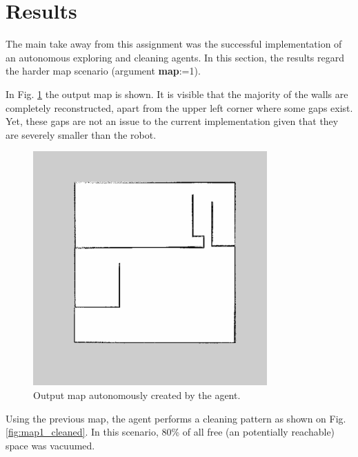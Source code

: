 \documentclass[]{article}
\begin{document}
\section{Results}

The main take away from this assignment was the successful implementation of an autonomous exploring and cleaning agents. In this section, the results regard the harder map scenario (argument \textbf{map}:=1).

In Fig. \ref{fig:map1} the output map is shown. It is visible that the majority of the walls are completely reconstructed, apart from the upper left corner where some gaps exist. Yet, these gaps are not an issue to the current implementation given that they are severely smaller than the robot.

\begin{figure}[ht]
    \centering
    \includegraphics[width=0.8\textwidth]{imgs/map1.pdf}
    \caption{Output map autonomously created by the agent.}
    \label{fig:map1}
\end{figure}

Using the previous map, the agent performs a cleaning pattern as shown on Fig. \ref{fig:map1_cleaned}. In this scenario, 80\% of all free (an potentially reachable) space was vacuumed. 
\end{document}
